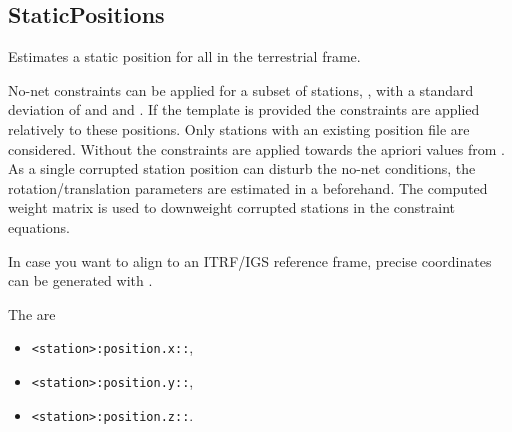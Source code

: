 \subsection{StaticPositions}\label{gnssParametrizationType:staticPositions}
Estimates a static position for all
 in the terrestrial frame.

No-net constraints can be applied for a subset of stations,
, with a
standard deviation of  and  and .
If the template  is provided
the constraints are applied relatively to these positions. Only stations with an existing position file
are considered. Without 
the constraints are applied towards the apriori values from
.
As a single corrupted station position can disturb the no-net conditions,
the rotation/translation parameters are estimated in a
beforehand. The computed weight matrix is used to downweight corrupted stations
in the constraint equations.

In case you want to align to an ITRF/IGS reference frame, precise coordinates can be
generated with .

The  are
\begin{itemize}
\item \verb|<station>:position.x::|,
\item \verb|<station>:position.y::|,
\item \verb|<station>:position.z::|.
\end{itemize}


